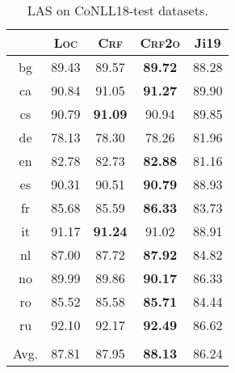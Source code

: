 \begin{table}[tb]
\centering

\begin{tabular}{ccccc}
\toprule
& \textsc{Loc} & \textsc{Crf} & \textsc{Crf2o} & Ji19 \\
\hline
bg   & 89.43 &         89.57  & \textbf{89.72} & 88.28 \\
ca   & 90.84 &         91.05  & \textbf{91.27} & 89.90 \\
cs   & 90.79 & \textbf{91.09} &         90.94  & 89.85 \\
de   & 78.13 &         78.30  &         78.26  & 81.96 \\
en   & 82.78 &         82.73  & \textbf{82.88} & 81.16 \\
es   & 90.31 &         90.51  & \textbf{90.79} & 88.93 \\
fr   & 85.68 &         85.59  & \textbf{86.33} & 83.73 \\
it   & 91.17 & \textbf{91.24} &         91.02  & 88.91 \\
nl   & 87.00 &         87.72  & \textbf{87.92} & 84.82 \\
no   & 89.99 &         89.86  & \textbf{90.17} & 86.33 \\
ro   & 85.52 &         85.58  & \textbf{85.71} & 84.44 \\
ru   & 92.10 &         92.17  & \textbf{92.49} & 86.62 \\[1pt]
\hline
\\[-10pt]
Avg. & 87.81 &         87.95  & \textbf{88.13} & 86.24 \\
\bottomrule
\end{tabular}
\caption{LAS on CoNLL18-test datasets.}
\label{table:conll18-test}
\end{table}